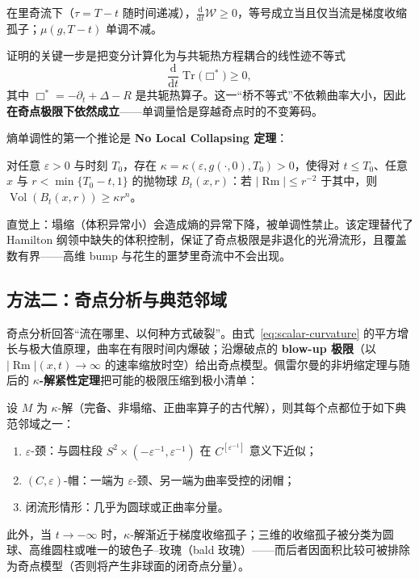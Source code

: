 \begin{theorem}\label{thm:entropy}
    在里奇流下（$\tau = T - t$ 随时间递减），$\frac{\mathrm{d}}{\mathrm{d}t}\mathcal{W} \geq 0$，等号成立当且仅当流是梯度收缩孤子；$\mu(g, T-t)$ 单调不减。
\end{theorem}

证明的关键一步是把变分计算化为与共轭热方程耦合的线性迹不等式
\begin{equation}
    \frac{\mathrm{d}}{\mathrm{d}t} \operatorname{Tr}\bigl( \Box^* \bigr) \geq 0,
\end{equation}
其中 $\Box^* = -\partial_t + \Delta - R$ 是共轭热算子。这一“桥不等式”不依赖曲率大小，因此\textbf{在奇点极限下依然成立}——单调量恰是穿越奇点时的不变筹码。

熵单调性的第一个推论是 \textbf{No Local Collapsing 定理}：

\begin{theorem}[非坍缩定理]\label{thm:nocollapse}
    对任意 $\varepsilon > 0$ 与时刻 $T_0$，存在 $\kappa = \kappa(\varepsilon, g(\cdot,0), T_0) > 0$，使得对 $t \leq T_0$、任意 $x$ 与 $r < \min\{T_0 - t, 1\}$ 的抛物球 $B_t(x, r)$：若 $|\operatorname{Rm}| \leq r^{-2}$ 于其中，则 $\operatorname{Vol}(B_t(x,r)) \geq \kappa r^n$。
\end{theorem}

直觉上：塌缩（体积异常小）会造成熵的异常下降，被单调性禁止。该定理替代了 Hamilton 纲领中缺失的体积控制，保证了奇点极限是非退化的光滑流形，且覆盖数有界——高维 bump 与花生的噩梦里奇流中不会出现。

\subsection{方法二：奇点分析与典范邻域}

奇点分析回答“流在哪里、以何种方式破裂”。由式~\eqref{eq:scalar-curvature} 的平方增长与极大值原理，曲率在有限时间内爆破；沿爆破点的\textbf{ blow-up 极限}（以 $|\operatorname{Rm}|(x,t) \to \infty$ 的速率缩放时空）给出奇点模型。佩雷尔曼的非坍缩定理与随后的\textbf{ $\kappa$-解紧性定理}把可能的极限压缩到极小清单：

\begin{theorem}\label{thm:canonical}
    设 $M$ 为 $\kappa$-解（完备、非塌缩、正曲率算子的古代解），则其每个点都位于如下典范邻域之一：
    \begin{enumerate}[label=(\roman*)]
        \item $\varepsilon$-颈：与圆柱段 $S^2 \times (-\varepsilon^{-1}, \varepsilon^{-1})$ 在 $C^{[\varepsilon^{-1}]}$ 意义下近似；
        \item $(C,\varepsilon)$-帽：一端为 $\varepsilon$-颈、另一端为曲率受控的闭帽；
        \item 闭流形情形：几乎为圆球或正曲率分量。
    \end{enumerate}
    此外，当 $t \to -\infty$ 时，$\kappa$-解渐近于梯度收缩孤子；三维的收缩孤子被分类为圆球、高维圆柱或唯一的玻色子--玫瑰（bald 玫瑰）——而后者因面积比较可被排除为奇点模型（否则将产生非球面的闭奇点分量）。
\end{theorem}

